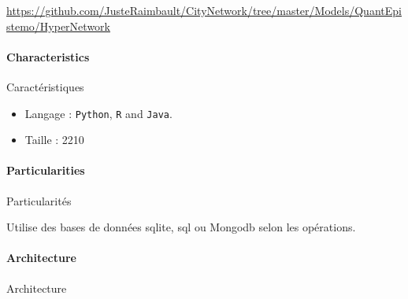 \url{https://github.com/JusteRaimbault/CityNetwork/tree/master/Models/QuantEpistemo/HyperNetwork}


\paragraph{Characteristics}{Caractéristiques}

\begin{itemize}
\item Langage : \texttt{Python}, \texttt{R} and \texttt{Java}.
\item Taille : 2210
\end{itemize}


\paragraph{Particularities}{Particularités}

Utilise des bases de données sqlite, sql ou Mongodb selon les opérations.

\paragraph{Architecture}{Architecture}













